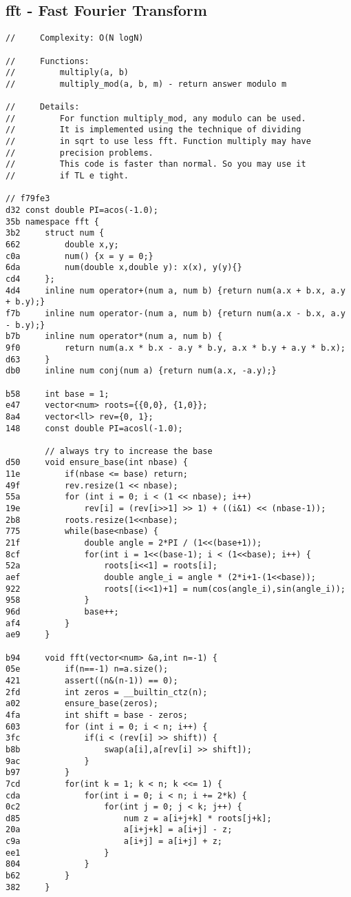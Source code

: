 \documentclass[11pt, a4paper, twoside]{article}
\begin{document}
\subsection{    fft - Fast Fourier Transform}
\begin{lstlisting}
//     Complexity: O(N logN)

//     Functions:
//         multiply(a, b)
//         multiply_mod(a, b, m) - return answer modulo m

//     Details:
//         For function multiply_mod, any modulo can be used. 
//         It is implemented using the technique of dividing 
//         in sqrt to use less fft. Function multiply may have
//         precision problems.
//         This code is faster than normal. So you may use it
//         if TL e tight.

// f79fe3
d32 const double PI=acos(-1.0);
35b namespace fft {
3b2     struct num {
662         double x,y;
c0a         num() {x = y = 0;}
6da         num(double x,double y): x(x), y(y){}
cd4     };
4d4     inline num operator+(num a, num b) {return num(a.x + b.x, a.y + b.y);}
f7b     inline num operator-(num a, num b) {return num(a.x - b.x, a.y - b.y);}
b7b     inline num operator*(num a, num b) {
9f0         return num(a.x * b.x - a.y * b.y, a.x * b.y + a.y * b.x);
d63     }
db0     inline num conj(num a) {return num(a.x, -a.y);}
     
b58     int base = 1;
e47     vector<num> roots={{0,0}, {1,0}};
8a4     vector<ll> rev={0, 1};
148     const double PI=acosl(-1.0);
     
        // always try to increase the base
d50     void ensure_base(int nbase) {
11e         if(nbase <= base) return;
49f         rev.resize(1 << nbase);
55a         for (int i = 0; i < (1 << nbase); i++)
19e             rev[i] = (rev[i>>1] >> 1) + ((i&1) << (nbase-1));
2b8         roots.resize(1<<nbase);
775         while(base<nbase) {
21f             double angle = 2*PI / (1<<(base+1));
8cf             for(int i = 1<<(base-1); i < (1<<base); i++) {
52a                 roots[i<<1] = roots[i];
aef                 double angle_i = angle * (2*i+1-(1<<base));
922                 roots[(i<<1)+1] = num(cos(angle_i),sin(angle_i));
958             }
96d             base++;
af4         }
ae9     }
     
b94     void fft(vector<num> &a,int n=-1) {
05e         if(n==-1) n=a.size();
421         assert((n&(n-1)) == 0);
2fd         int zeros = __builtin_ctz(n);
a02         ensure_base(zeros);
4fa         int shift = base - zeros;
603         for (int i = 0; i < n; i++) {
3fc             if(i < (rev[i] >> shift)) {
b8b                 swap(a[i],a[rev[i] >> shift]);
9ac             }
b97         }
7cd         for(int k = 1; k < n; k <<= 1) {
cda             for(int i = 0; i < n; i += 2*k) {
0c2                 for(int j = 0; j < k; j++) {
d85                     num z = a[i+j+k] * roots[j+k];
20a                     a[i+j+k] = a[i+j] - z;
c9a                     a[i+j] = a[i+j] + z;
ee1                 }
804             }
b62         }
382     }
     

\end{lstlisting}
\end{document}

